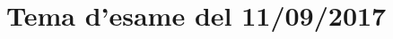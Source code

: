 \documentclass[main.tex]{subfiles}
\begin{document}
\section{Tema d'esame del 11/09/2017}


\clearpage

\clearpage

\end{document}
